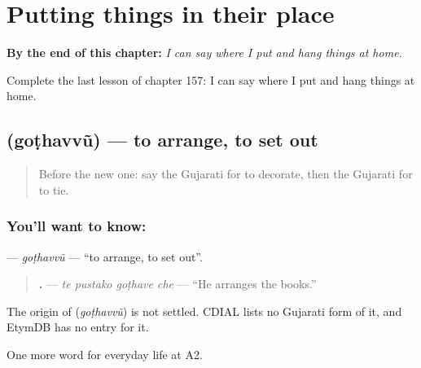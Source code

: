 
\chapter{Putting things in their place}
\label{ch:gu-putting-things-in-their-place}

\begin{chapteropening}
\textbf{By the end of this chapter:} \emph{I can say where I put and hang things at home.}

Complete the last lesson of chapter 157: I can say where I put and hang things at home.
\end{chapteropening}

\section[\texorpdfstring{\gu{ગોઠવવું} (goṭhavvũ)}{ગોઠવવું (goṭhavvũ)}]{ (goṭhavvũ) — to arrange, to set out}

\label{lesson:GU-C157-gothavvu}



\begin{quote}
Before the new one: say the Gujarati for to decorate, then the Gujarati for to tie.
\end{quote}

\subsection*{You'll want to know: }
\textbf{} — \emph{goṭhavvũ} — \textquotedblleft{}to arrange, to set out\textquotedblright{}.

\begin{quote}
\textbf{   .} — \emph{te pustako goṭhave che} — \textquotedblleft{}He arranges the books.\textquotedblright{}
\end{quote}

\begin{cousinweb}
The origin of \textbf{} (\emph{goṭhavvũ}) is not settled. CDIAL lists no Gujarati form of it, and EtymDB has no entry for it.
\end{cousinweb}

\begin{grammarlens}[title={What you've built}]
One more word for everyday life at A2.
\end{grammarlens}

